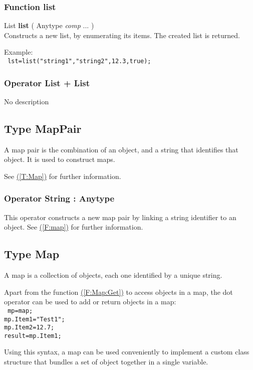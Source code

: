 \documentclass[10pt]{book}
\newcommand{\linkitem}[1]{\hyperref[#1]{\nameref{#1} (\ref{#1})}}
\newcommand{\sourcecode}[1]{\texttt{#1}}
\begin{document}
\subsubsection{Function list \label{F:list}}
List \textbf{list} ( Anytype \textit{comp} ...  ) \\
Constructs a new list, by enumerating its items. The created list is returned.

Example: \\
\sourcecode{
lst=list("string1","string2",12.3,true); \\
}

\subsubsection{Operator List + List \label{O:List+List}}
No description

\subsection{Type MapPair \label{T:MapPair}}
A map pair is the combination of an object, and a string that identifies that object. It is used to construct maps.

See \linkitem{T:Map} for further information.

\subsubsection{Operator String : Anytype \label{O:String:Anytype}}
This operator constructs a new map pair by linking a string identifier to an object. See \linkitem{F:map} for further information.

\subsection{Type Map \label{T:Map}}
A map is a collection of objects, each one identified by a unique string. 

Apart from the function \linkitem{F:Map:Get} to access objects in a map, the dot operator can be used to add or return objects in a map: \\
\sourcecode{
mp=map; \\
mp.Item1="Test1"; \\
mp.Item2=12.7; \\
result=mp.Item1;
}

Using this syntax, a map can be used conveniently to implement a custom class structure that bundles a set of object together in a single variable.
\end{document}
